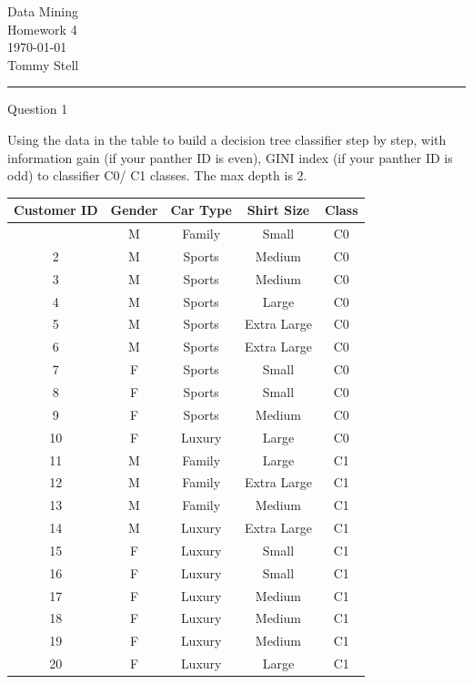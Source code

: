\documentclass[12pt,letterpaper, onecolumn]{exam}
\begin{document}
\begingroup
    \centering
    \LARGE Data Mining\\
    \LARGE Homework 4\\[0.5em]
    \large \today\\[0.5em]
    \large Tommy Stell\par

\endgroup
\noindent\rule{\textwidth}{0.4pt}
\pointsdroppedatright   %
\printanswers
\renewcommand{\solutiontitle}{\noindent\textbf{Ans:}\enspace}   %

\begin{questions}

    \question[20] Question 1\droppoints

    Using the data in the table to build a decision tree classifier step by step, with information gain (if your panther ID is even), GINI index (if your panther ID is odd) to classifier C0/ C1 classes. The max depth is 2.

    {\small
        \begin{longtable}{|c|c|c|c|c|}
            \hline Customer ID & Gender & Car Type & Shirt Size & Class \\ \hline
            \endhead
            \hline
            \endfoot
            1 & M & Family & Small & C0 \\
            2 & M & Sports & Medium & C0 \\
            3 & M & Sports & Medium & C0 \\
            4 & M & Sports & Large & C0 \\
            5 & M & Sports & Extra Large & C0 \\
            6 & M & Sports & Extra Large & C0 \\
            7 & F & Sports & Small & C0 \\
            8 & F & Sports & Small & C0 \\
            9 & F & Sports & Medium & C0 \\
            10 & F & Luxury & Large & C0 \\
            11 & M & Family & Large & C1 \\
            12 & M & Family & Extra Large & C1 \\
            13 & M & Family & Medium & C1 \\
            14 & M & Luxury & Extra Large & C1 \\
            15 & F & Luxury & Small & C1 \\
            16 & F & Luxury & Small & C1 \\
            17 & F & Luxury & Medium & C1 \\
            18 & F & Luxury & Medium & C1 \\
            19 & F & Luxury & Medium & C1 \\
            20 & F & Luxury & Large & C1
        \end{longtable}
        }


\end{questions}
\end{document}
